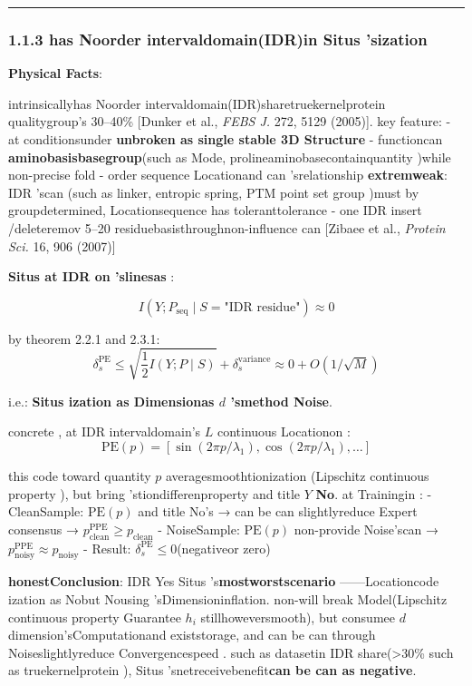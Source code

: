 \documentclass[
  12pt,
]{article}
\begin{document}
\begin{center}\rule{0.5\linewidth}{0.5pt}\end{center}

\subsubsection{1.1.3 has Noorder intervaldomain(IDR)in  Situs
'sization }\label{ux56faux6709ux65e0ux5e8fux533aux57dfidrux4e2d-situs-ux7684ux9000ux5316}

\textbf{Physical Facts}: 

intrinsicallyhas Noorder intervaldomain(IDR)sharetruekernelprotein qualitygroup's 30--40\% {[}Dunker et al.,
\emph{FEBS J.} 272, 5129 (2005){]}. key feature:  -
at conditionsunder \textbf{unbroken as single stable  3D Structure} -
functioncan \textbf{aminobasisbasegroup}(such as Mode, prolineaminobasecontainquantity )while non-precise fold  -
order sequence Locationand can 'srelationship \textbf{extremweak}: IDR 'scan (such as  linker, entropic
spring, PTM point set group )must by groupdetermined, Locationsequence has toleranttolerance - one  IDR
insert /deleteremov 5--20 residuebasisthroughnon-influence can  {[}Zibaee et al., \emph{Protein
Sci.} 16, 906 (2007){]}

\textbf{Situs at  IDR on 'slinesas }: 

\[I(Y; P_{\text{seq}} \mid S = \text{"IDR residue"}) \approx 0\]

by theorem  2.2.1 and  2.3.1: 
\[\delta_s^{\text{PE}} \leq \sqrt{\frac{1}{2} I(Y; P \mid S)} + \delta_s^{\text{variance}} \approx 0 + O(1/\sqrt{M})\]

i.e.: \textbf{Situs ization as Dimensionas  \(d\) 'smethod Noise}. 

concrete , at  IDR intervaldomain's \(L\) continuous Locationon : 
\[\text{PE}(p) = [\sin(2\pi p/\lambda_1), \cos(2\pi p/\lambda_1), \ldots]\]

this code toward quantity  \(p\) averagesmoothtionization (Lipschitz
continuous property ), but bring 'stiondifferenproperty and title  \(Y\) \textbf{No}. at Trainingin :  -
CleanSample: \(\text{PE}(p)\) and title No's →
can be can slightlyreduce Expert consensus →
\(p_{\text{clean}}^{\text{PPE}} \geq p_{\text{clean}}\) -
NoiseSample: \(\text{PE}(p)\) non-provide Noise'scan  →
\(p_{\text{noisy}}^{\text{PPE}} \approx p_{\text{noisy}}\) -
Result: \(\delta_s^{\text{PE}} \leq 0\)(negativeor zero)

\textbf{honestConclusion}: IDR Yes Situs
's\textbf{mostworstscenario }------Locationcode ization as Nobut Nousing 'sDimensioninflation. non-will break Model(Lipschitz
continuous property Guarantee \(h_i\) stillhoweversmooth), but consumee \(d\)
dimension'sComputationand existstorage, and can be can through Noiseslightlyreduce Convergencespeed . such as datasetin  IDR
share(\textgreater30\% such as truekernelprotein ), Situs 'snetreceivebenefit\textbf{can be can as negative}. 
\end{document}
